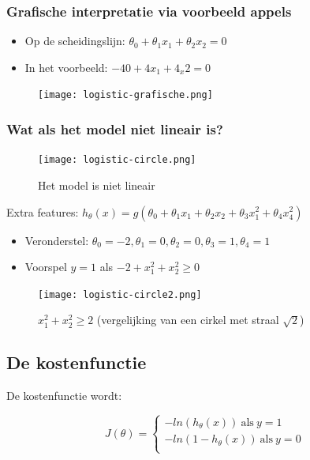 \documentclass{article}
\begin{document}
\subsubsection{Grafische interpretatie via voorbeeld appels}

\begin{itemize}
    \item Op de scheidingslijn: $\theta_0 + \theta_1x_1 + \theta_2x_2 = 0$
    \item In het voorbeeld: $-40 + 4x_1 + 4_x2 = 0$
\end{itemize}

\begin{figure}[H]
    \centering
    \texttt{[image: logistic-grafische.png]}
    \caption{}
\end{figure}

\subsubsection{Wat als het model niet lineair is?}

\begin{figure}[H]
    \centering
    \texttt{[image: logistic-circle.png]}
    \caption{Het model is niet lineair}
\end{figure}


Extra features: $h_{\theta}(x) = g(\theta_0 + \theta_1x_1 + \theta_2x_2 + \theta_3x_1^2 + \theta_4x_4^2)$

\begin{itemize}
    \item Veronderstel: $\theta_0 = -2, \theta_1 = 0, \theta_2 = 0, \theta_3 = 1, \theta_4 = 1$
    \item Voorspel $y=1$ als $-2 + x_1^2 + x_2^2 \geq 0$
\end{itemize}

\begin{figure}[H]
    \centering
    \texttt{[image: logistic-circle2.png]}
    \caption{$x_1^2 + x_2^2 \geq 2$ (vergelijking van een cirkel met straal $\sqrt{2}$)}
\end{figure}

\subsection{De kostenfunctie}

De kostenfunctie wordt:

\begin{equation}
J(\theta) = \left\{
    \begin{array}{ll}
        -ln(h_\theta(x))\ \text{als}\ y = 1\\
        -ln(1 - h_\theta(x))\ \text{als}\ y = 0\\
    \end{array}
\right.
\end{equation}
\end{document}
